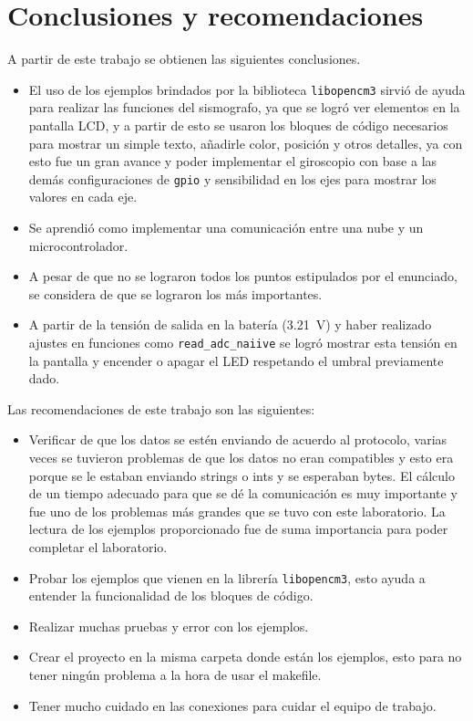 \section{Conclusiones y recomendaciones}
A partir de este trabajo se obtienen las siguientes conclusiones.
\begin{itemize}
\item El uso de los ejemplos brindados por la biblioteca \texttt{libopencm3} sirvió de ayuda para realizar las funciones del sismografo, ya que se logró ver elementos en la pantalla LCD, y a partir de esto se usaron los bloques de código necesarios para mostrar un simple texto, añadirle color, posición y otros detalles, ya con esto fue un gran avance y poder implementar el giroscopio con base a las demás configuraciones de \texttt{gpio} y sensibilidad en los ejes para mostrar los valores en cada eje.
\item Se aprendió como implementar una comunicación entre una nube y un microcontrolador.
\item A pesar de que no se lograron todos los puntos estipulados por el enunciado, se considera de que se lograron los más importantes. 
\item A partir de la tensión de salida en la batería (\SI{3.21}{\volt}) y haber realizado ajustes en funciones como \texttt{read\_adc\_naiive} se logró mostrar esta tensión en la pantalla y encender o apagar el LED respetando el umbral previamente dado.
\end{itemize}

Las recomendaciones de este trabajo son las siguientes:
\begin{itemize}
\item Verificar de que los datos se estén enviando de acuerdo al protocolo, varias veces se tuvieron problemas de que los datos no eran compatibles y esto era porque se le estaban enviando strings o ints y se esperaban bytes. El cálculo de un tiempo adecuado para que se dé la comunicación es muy importante y fue uno de los problemas más grandes que se tuvo con este laboratorio. La lectura de los ejemplos proporcionado fue de suma importancia para poder completar el laboratorio.
\item Probar los ejemplos que vienen en la librería \texttt{libopencm3}, esto ayuda a entender la funcionalidad de los bloques de código.
\item Realizar muchas pruebas y error con los ejemplos.
\item Crear el proyecto en la misma carpeta donde están los ejemplos, esto para no tener ningún problema a la hora de usar el makefile.
\item Tener mucho cuidado en las conexiones para cuidar el equipo de trabajo.
\end{itemize}

